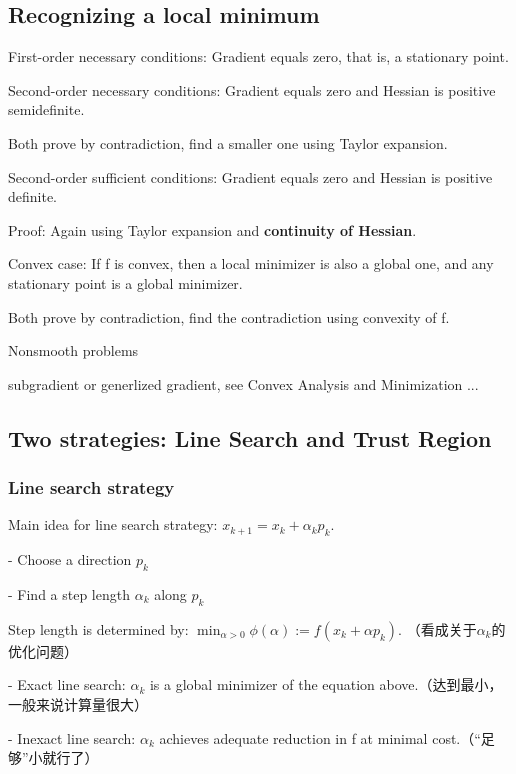 \subsection{Recognizing a local minimum}

First-order necessary conditions: Gradient equals zero, that is, a stationary point.

Second-order necessary conditions: Gradient equals zero and Hessian is positive semidefinite.

Both prove by contradiction, find a smaller one using Taylor expansion.

Second-order sufficient conditions: Gradient equals zero and Hessian is positive definite.

Proof: Again using Taylor expansion and  \textbf{continuity of Hessian}.

Convex case: If f is convex, then a local minimizer is also a global one, and any stationary point is a global minimizer.

Both prove by contradiction, find the contradiction using convexity of f.

Nonsmooth problems

subgradient or generlized gradient, see Convex Analysis and Minimization ...

\vspace{15pt}

\subsection{Two strategies: Line Search and Trust Region}

\subsubsection{Line search strategy}

Main idea for line search strategy: $x_{k+1}=x_{k}+\alpha_{k} p_{k}$.

- Choose a direction $p_{k}$

- Find a step length $\alpha_{k}$ along $p_{k}$ 

Step length is determined by: $\min _{\alpha>0} \phi(\alpha):=f\left(x_{k}+\alpha p_{k}\right)$. （看成关于$\alpha_k$的优化问题）

- Exact line search: $\alpha_{k}$ is a global minimizer of the equation above.（达到最小，一般来说计算量很大）

- Inexact line search: $\alpha_{k}$ achieves adequate reduction in f at minimal cost.（“足够”小就行了）

